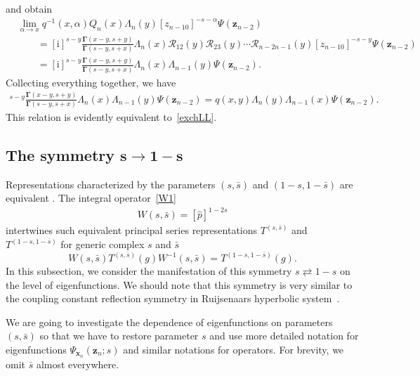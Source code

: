 \documentclass[pdftex]{sigma}
\renewcommand{\imath}{\mathrm{i}}
\numberwithin{equation}{section}
\begin{document}
and obtain
\begin{align*}
&
\lim\limits_{\alpha\to x}
q^{-1}(x,\alpha) Q_n(x) \Lambda_n(y)
[z_{n-1 0}]^{-s-\alpha} \Psi(\bm z_{n-2}) \\
&
\qquad =
[\imath]^{s-y} \frac{\mathbf{\Gamma}(x-y,s+y)}
{\mathbf{\Gamma}(s-y,s+x)} \Lambda_n(x) \mathcal{R}_{12}(y)\mathcal{R}_{23}(y)\cdots
\mathcal{R}_{n-2 n-1}(y) [z_{n-1 0}]^{-s-y} \Psi(\bm z_{n-2}) \\
&
\qquad =
[\imath]^{s-y} \frac{\mathbf{\Gamma}(x-y,s+y)}
{\mathbf{\Gamma}(s-y,s+x)}
\Lambda_n(x) \Lambda_{n-1}(y) \Psi(\bm z_{n-2}) .
\end{align*}
Collecting everything together, we have
\begin{align*}
[\imath]^{s-y} \frac{\mathbf{\Gamma}(x-y,s+y)}
{\mathbf{\Gamma}(s-y,s+x)}
\Lambda_n(x) \Lambda_{n-1}(y) \Psi(\bm z_{n-2}) = q(x,y) \Lambda_{n}(y) \Lambda_{n-1}(x) \Psi(\bm z_{n-2}) .
\end{align*}
This relation is evidently equivalent to~\eqref{exchLL}.


\subsection[The symmetry s to 1-s]{The symmetry $\boldsymbol{s \to 1-s}$} \label{sect:SpinSym}

Representations characterized by the
parameters $(s, \bar s)$ and $(1-s, 1-\bar{s})$ are equivalent \cite{GGV, GN}.
The integral operator~\eqref{W1}
\begin{align*}
W(s,\bar{s}) = [\hat{p}]^{1-2s}
\end{align*}
intertwines such equivalent principal series representations $T^{(s,\bar{s})}$
and $T^{(1-s,1-\bar{s})}$ for generic complex $s$ and $\bar{s}$
\begin{equation}
\label{splet1}
W(s,\bar{s}) T^{(s,\bar{s})}(g) W^{-1}(s,\bar{s}) =
T^{(1-s,1-\bar{s})}(g) .
\end{equation}
In this subsection, we consider the manifestation of this
symmetry $s \rightleftarrows 1-s$ on the level of eigenfunctions.
We should note that this symmetry is very similar to the
coupling constant reflection symmetry in Ruijsenaars hyperbolic
system~\cite{BDKK4}.

We are going to investigate the dependence of eigenfunctions
on parameters $(s, \bar s)$ so that we have to restore
parameter $s$ and use more detailed notation for eigenfunctions
$\Psi_{\bm x_n}(\bm z_n;s)$ and similar notations for operators.
For brevity, we omit $\bar{s}$ almost everywhere.
\end{document}
